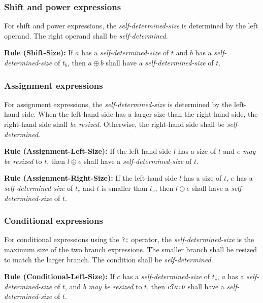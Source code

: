\documentclass{article}
\newcommand{\sds}{\emph{self-determined-size}}
\newcommand{\mbr}{\emph{may be resized}}
\newenvironment{typingrule}[1]%
{\par\noindent\textbf{Rule (#1):} }%
{\par}
\begin{document}
\subsubsection{Shift and power expressions}%

For shift and power expressions, the \sds{} is determined
by the left operand. The right operand shall be \emph{self-determined}.

\begin{typingrule}{Shift-Size}
  If $a$ has a \sds{} of $t$ and $b$ has a
  \sds{} of $t_{b}$, then $a \oplus b$ shall have a
  \sds{} of $t$.
\end{typingrule}

\subsubsection{Assignment expressions}%

For assignment expressions, the \sds{} is determined by the
left-hand side. When the left-hand side has a larger size than the right-hand
side, the right-hand side shall \emph{be resized}. Otherwise, the right-hand
side shall be \emph{self-determined}.

\begin{typingrule}{Assignment-Left-Size}
  If the left-hand side $l$ has a size of $t$ and $e$ \mbr{} to
  $t$, then $l \oplus e$ shall have a \sds{} of $t$.
\end{typingrule}

\begin{typingrule}{Assignment-Right-Size}
  If the left-hand side $l$ has a size of $t$, $e$ has a
  \sds{} of $t_{e}$ and $t$ is smaller than $t_{e}$, then
  $l \oplus e$ shall have a \sds{} of $t$.
\end{typingrule}

\subsubsection{Conditional expressions}%

For conditional expressions using the \texttt{?:} operator, the
\sds{} is the maximum size of the two branch expressions.
The smaller branch shall be resized to match the larger branch. The condition
shall be \emph{self-determined}.

\begin{typingrule}{Conditional-Left-Size}
  If $c$ has a \sds{} of $t_{c}$, $a$ has a
  \sds{} of $t$, and $b$ \mbr{} to $t$,
  then $c \verb|?| a \verb|:| b$ shall have a \sds{} of
  $t$.
\end{typingrule}
\end{document}
